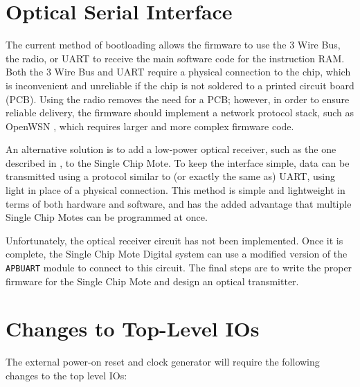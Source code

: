 \section{Optical Serial Interface}
The current method of bootloading allows the firmware to use the 3 Wire Bus, the radio, or UART to receive the main software code for the instruction RAM. Both the 3 Wire Bus and UART require a physical connection to the chip, which is inconvenient and unreliable if the chip is not soldered to a printed circuit board (PCB). Using the radio removes the need for a PCB; however, in order to ensure reliable delivery, the firmware should implement a network protocol stack, such as OpenWSN \cite{openwsn}, which requires larger and more complex firmware code.

An alternative solution is to add a low-power optical receiver, such as the one described in \cite{optical-wakeup}, to the Single Chip Mote. To keep the interface simple, data can be transmitted using a protocol similar to (or exactly the same as) UART, using light in place of a physical connection. This method is simple and lightweight in terms of both hardware and software, and has the added advantage that multiple Single Chip Motes can be programmed at once.

Unfortunately, the optical receiver circuit has not been implemented. Once it is complete, the Single Chip Mote Digital system can use a modified version of the \texttt{APBUART} module to connect to this circuit. The final steps are to write the proper firmware for the Single Chip Mote and design an optical transmitter.

\section{Changes to Top-Level IOs}
The external power-on reset and clock generator will require the following changes to the top level IOs:

